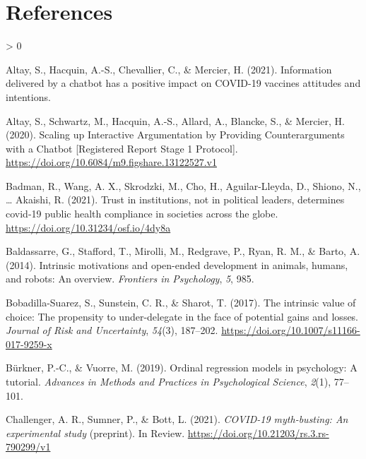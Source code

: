 \documentclass[
  english,
  ,jou,floatsintext]{apa6}
\newlength{\cslhangindent}
\newenvironment{CSLReferences}[2] %
 {%
  \setlength{\parindent}{0pt}
  \ifodd #1 \everypar{\setlength{\hangindent}{\cslhangindent}}\ignorespaces\fi
  \ifnum #2 > 0
  \setlength{\parskip}{#2\baselineskip}
  \fi
 }%
 {}
\begin{document}
\hypertarget{references}{%
\section*{References}\label{references}}

\hypertarget{refs}{}
\begin{CSLReferences}{1}{0}
\leavevmode\hypertarget{ref-altay2021information}{}%
Altay, S., Hacquin, A.-S., Chevallier, C., \& Mercier, H. (2021). Information delivered by a chatbot has a positive impact on COVID-19 vaccines attitudes and intentions.

\leavevmode\hypertarget{ref-altay_scaling_2020}{}%
Altay, S., Schwartz, M., Hacquin, A.-S., Allard, A., Blancke, S., \& Mercier, H. (2020). Scaling up {Interactive} {Argumentation} by {Providing} {Counterarguments} with a {Chatbot} {[}{Registered} {Report} {Stage} 1 {Protocol}{]}. \url{https://doi.org/10.6084/m9.figshare.13122527.v1}

\leavevmode\hypertarget{ref-badman2021}{}%
Badman, R., Wang, A. X., Skrodzki, M., Cho, H., Aguilar-Lleyda, D., Shiono, N., \ldots{} Akaishi, R. (2021). Trust in institutions, not in political leaders, determines covid-19 public health compliance in societies across the globe. \url{https://doi.org/10.31234/osf.io/4dy8a}

\leavevmode\hypertarget{ref-baldassarre2014intrinsic}{}%
Baldassarre, G., Stafford, T., Mirolli, M., Redgrave, P., Ryan, R. M., \& Barto, A. (2014). Intrinsic motivations and open-ended development in animals, humans, and robots: An overview. \emph{Frontiers in Psychology}, \emph{5}, 985.

\leavevmode\hypertarget{ref-bobadilla-suarez_intrinsic_2017}{}%
Bobadilla-Suarez, S., Sunstein, C. R., \& Sharot, T. (2017). The intrinsic value of choice: {The} propensity to under-delegate in the face of potential gains and losses. \emph{Journal of Risk and Uncertainty}, \emph{54}(3), 187--202. \url{https://doi.org/10.1007/s11166-017-9259-x}

\leavevmode\hypertarget{ref-burkner2019ordinal}{}%
Bürkner, P.-C., \& Vuorre, M. (2019). Ordinal regression models in psychology: A tutorial. \emph{Advances in Methods and Practices in Psychological Science}, \emph{2}(1), 77--101.

\leavevmode\hypertarget{ref-challenger_covid-19_2021}{}%
Challenger, A. R., Sumner, P., \& Bott, L. (2021). \emph{{COVID}-19 myth-busting: An experimental study} (preprint). In Review. \url{https://doi.org/10.21203/rs.3.rs-790299/v1}


\end{CSLReferences}
\end{document}
